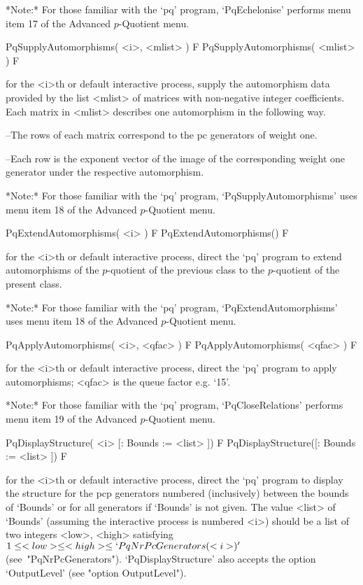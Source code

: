 *Note:*
For those familiar with the `pq'  program,  `PqEchelonise'  performs  menu
item 17 of the Advanced $p$-Quotient menu.

\>PqSupplyAutomorphisms( <i>, <mlist> ) F
\>PqSupplyAutomorphisms( <mlist> ) F

for  the  <i>th  or  default  interactive {\ANUPQ}  process,  supply  the
automorphism  data  provided  by   the  list  <mlist>  of  matrices  with
non-negative integer coefficients.  Each  matrix in <mlist> describes one
automorphism in the following way.

\beginlist%
\item{--}The rows of each matrix  correspond  to  the  pc  generators  of
weight one.

\item{--}Each  row  is  the  exponent  vector  of  the   image   of   the
corresponding weight one generator under the respective automorphism.

\endlist

*Note:* 
For those familiar with the  `pq'  program,  `PqSupplyAutomorphisms'  uses
menu item 18 of the Advanced $p$-Quotient menu.

\>PqExtendAutomorphisms( <i> ) F
\>PqExtendAutomorphisms() F

for the <i>th or default interactive {\ANUPQ} process,  direct  the  `pq'
program to extend automorphisms of the $p$-quotient of the previous class
to the $p$-quotient of the present class.     

*Note:*
For those familiar with the  `pq'  program,  `PqExtendAutomorphisms'  uses
menu item 18 of the Advanced $p$-Quotient menu.

\>PqApplyAutomorphisms( <i>, <qfac> ) F
\>PqApplyAutomorphisms( <qfac> ) F

for the <i>th or default interactive {\ANUPQ} process,  direct  the  `pq'
program to apply automorphisms; <qfac> is the queue factor e.g. `15'.

*Note:* 
For those familiar with  the  `pq'  program,  `PqCloseRelations'  performs
menu item 19 of the Advanced $p$-Quotient menu.

\>PqDisplayStructure( <i> [: Bounds := <list> ]) F
\>PqDisplayStructure([: Bounds := <list> ]) F

for the <i>th or default interactive {\ANUPQ} process,  direct  the  `pq'
program  to  display  the  structure  for  the  pcp  generators   numbered
(inclusively) between the bounds of `Bounds' or  for  all  generators  if
`Bounds' is not  given.  The  value  <list>  of  `Bounds'  (assuming  the
interactive process is numbered <i>) should be a  list  of  two  integers
<low>,   <high>   satisfying   $1    \le    <low>    \le    <high>    \le
`PqNrPcGenerators(<i>)'$  (see~"PqNrPcGenerators").  `PqDisplayStructure'
also accepts the option `OutputLevel' (see "option OutputLevel").

